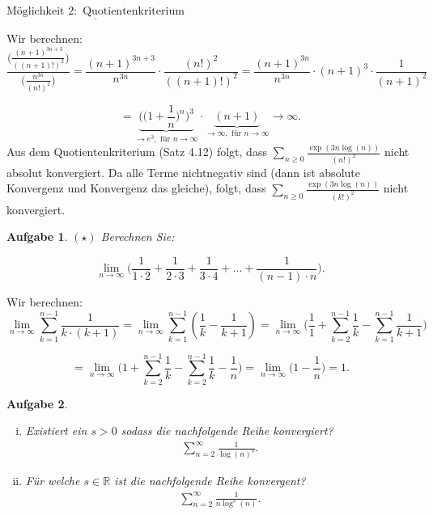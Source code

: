 \documentclass[a4paper, 20]{exam}
\newtheorem{ex}{Aufgabe}
\begin{document}
\begin{solution}
\begin{enumerate}[i.)]
$\underline{\text{M\"oglichkeit }2: \text{ Quotientenkriterium}}$

Wir berechnen:
$$ \frac{\bigg(\frac{(n+1)^{3n+3}}{((n+1)!)^2} \bigg)}{\bigg(\frac{n^{3n}}{(n!)^2} \bigg)} 
= \frac{(n+1)^{3n+3}}{n^{3n}} \cdot \frac{(n!)^2}{((n+1)!)^2}
= \frac{(n+1)^{3n}}{n^{3n}} \cdot (n+1)^3 \cdot \frac{1}{(n+1)^2}$$

$$=\underbrace{\bigg(\Big( 1+ \frac{1}{n} \Big)^{n}\bigg)^3}_{\longrightarrow e^3, \text{ f\"ur } n\longrightarrow \infty} \cdot \underbrace{(n+1)}_{\longrightarrow \infty, \text{ f\"ur } n \longrightarrow \infty} \longrightarrow \infty.$$
Aus dem Quotientenkriterium (Satz 4.12) folgt, dass $\sum_{n\geq 0} \frac{\exp(3n \log(n))}{(n!)^2}$ nicht absolut konvergiert. Da alle Terme nichtnegativ sind (dann ist absolute Konvergenz und Konvergenz das gleiche), folgt, dass $\sum_{n\geq 0} \frac{\exp(3n \log(n))}{(k!)^2}$ nicht konvergiert.
\end{enumerate}
\end{solution}


\begin{ex}{$(\star)$}
Berechnen Sie:

$$ \lim_{n \rightarrow \infty} \bigg( \frac{1}{1\cdot 2} + \frac{1}{2\cdot 3} + \frac{1}{3 \cdot 4} + \dots + \frac{1}{(n-1)\cdot n} \bigg).$$
\end{ex}
\begin{solution}
Wir berechnen:
$$ \lim_{n\rightarrow \infty} \sum_{k=1}^{n-1} \frac{1}{k\cdot (k+1)}
= \lim_{n\rightarrow \infty} \sum_{k=1}^{n-1} \left(\frac{1}{k}- \frac{1}{k+1} \right)
= \lim_{n\rightarrow \infty} \bigg(\frac{1}{1}+ \sum_{k=2}^{n-1} \frac{1}{k} - \sum_{k=1}^{n-1} \frac{1}{k+1}\bigg)$$

$$= \lim_{n\rightarrow \infty} \bigg(1+ \sum_{k=2}^{n-1} \frac{1}{k} - \sum_{k=2}^{n-1} \frac{1}{k} -\frac{1}{n}\bigg)
= \lim_{n\rightarrow \infty} \bigg( 1 - \frac{1}{n} \bigg)= 1.$$
\end{solution}

\begin{ex} \ \begin{enumerate}[i)]
\item Existiert ein $s >0$ sodass die nachfolgende Reihe konvergiert?
\begin{align*}
\sum_{n=2}^\infty \frac{1}{\log(n)^s}.
\end{align*}
\item Für welche $s \in \mathbb{R}$ ist die nachfolgende Reihe konvergent?
\begin{align*}
\sum_{n=2}^\infty \frac{1}{n \log^s (n) }.
\end{align*}
\end{enumerate}

\end{ex}
\end{document}
